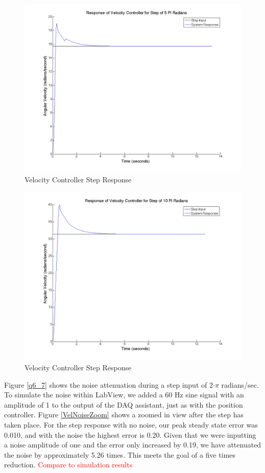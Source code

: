 \documentclass{article}
\newcommand{\xxx}[1]{\textcolor{red}{#1}}
\theoremstyle{plain}
\theoremstyle{definition}
\theoremstyle{remark}
\begin{document}
\begin{figure}
\begin{center}
\includegraphics[width = 12cm]{velstep5Pi.png}
\caption{Velocity Controller Step Response}
\label{q6_5}
\end{center}
\end{figure}

\begin{figure}
\begin{center}
\includegraphics[width = 12cm]{velstep10Pi.png}
\caption{Velocity Controller Step Response}
\label{q6_6}
\end{center}
\end{figure}

Figure \ref{q6_7} shows the noise attenuation during a step input of 2$\cdot\pi$ radians/sec. To simulate the noise within LabView, we added a 60 Hz sine signal with an amplitude of 1 to the output of the DAQ assistant, just as with the position controller. Figure \ref{VelNoiseZoom} shows a zoomed in view after the step has taken place. For the step response with no noise, our peak steady state error was 0.010, and with the noise the highest error is 0.20. Given that we were inputting a noise amplitude of one and the error only increased by 0.19, we have attenuated the noise by approximately 5.26 times. This meets the goal of a five times reduction.
\xxx{Compare to simulation results}
\end{document}
